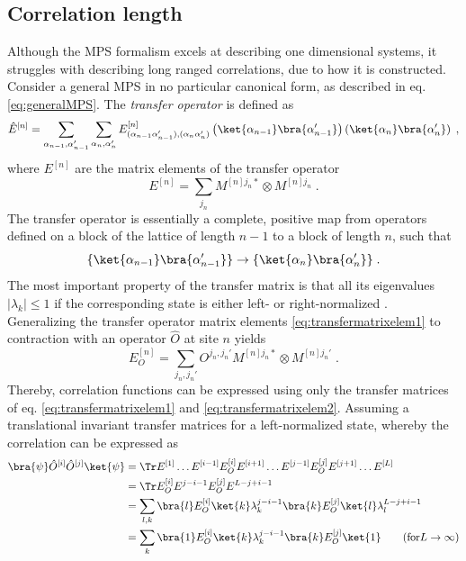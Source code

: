 \subsection{Correlation length}
Although the MPS formalism excels at describing one dimensional systems, it struggles with describing long ranged correlations, due to how it is constructed.
Consider a general MPS in no particular canonical form, as described in eq. \eqref{eq:generalMPS}. The \textit{transfer operator} is defined as
\begin{equation}
	\hat{E}^{[n]} = \sum_{\alpha_{n-1}, \alpha_{n-1}'} \sum_{\alpha_{n}, \alpha_{n}'} E_{(\alpha_{n-1} \alpha_{n-1}'),(\alpha_{n}  \alpha_{n}')}^{[n]} \left( \ket{\alpha_{n-1}}\bra{\alpha_{n-1}'} \right) \left( \ket{\alpha_{n}}\bra{\alpha_{n}'} \right) \; ,
\end{equation}   
where $E^{[n]}$ are the matrix elements of the transfer operator
\begin{equation}
	E^{[n]} = \sum_{j_n} M^{[n] j_n *} \otimes M^{[n] j_n}  \; . \label{eq:transfermatrixelem1}
\end{equation}
The transfer operator is essentially a complete, positive map from operators defined on a block of the lattice of length $n-1$ to a block of length $n$, such that
\begin{equation}
	\{ \ket{\alpha_{n-1}}\bra{\alpha_{n-1}'} \} \to \{ \ket{\alpha_{n}}\bra{\alpha_{n}'} \} \; .
\end{equation}
The most important property of the transfer matrix is that all its eigenvalues $|\lambda_k| \leq 1 $ if the corresponding state is either left- or right-normalized \cite{schollwock}. \\
Generalizing the transfer operator matrix elements \eqref{eq:transfermatrixelem1} to contraction with an operator $\hat{O}$ at site $n$ yields 
\begin{equation}
	E_{O}^{[n]} = \sum_{j_n , j_n '} O^{j_n , j_n '} M^{[n] j_n *} \otimes  M^{[n] j_n '} \; . \label{eq:transfermatrixelem2}
\end{equation}
Thereby, correlation functions can be expressed using only the transfer matrices of eq. \eqref{eq:transfermatrixelem1} and \eqref{eq:transfermatrixelem2}. Assuming a translational invariant transfer matrices for a left-normalized state, whereby the correlation can be expressed as  
\begin{align}
	\bra{\psi} \hat{O}^{[i]} \hat{O}^{[j]} \ket{\psi} &= \Tr E^{[1]} \ldots E^{[i-1]} E_{O}^{[i]} E^{[i+1]} \ldots E^{[j-1]} E_{O}^{[j]} E^{[j+1]} \ldots E^{[L]} \nonumber \\
	&= \Tr E_{O}^{[i]} E^{j-i-1} E_{O}^{[j]} E^{L-j+i-1} \nonumber \\ 
	&= \sum_{l , k} \bra{l} E_{O}^{[i]} \ket{k} \lambda_{k}^{j-i-1} \bra{k} E_{O}^{[j]} \ket{l} \lambda_{l}^{L-j+i-1} \nonumber \\ 
	&= \sum_{k} \bra{1} E_{O}^{[i]} \ket{k} \lambda_{k}^{j-i-1} \bra{k} E_{O}^{[j]} \ket{1} \qquad (\mathrm{for } L \to \infty)
\end{align}
